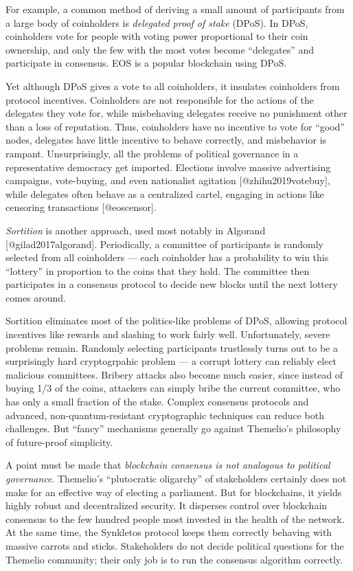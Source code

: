 \documentclass[]{article}
\begin{document}
For example, a common method of deriving a small amount of participants
from a large body of coinholders is \emph{delegated proof of stake}
(DPoS). In DPoS, coinholders vote for people with voting power
proportional to their coin ownership, and only the few with the most
votes become ``delegates'' and participate in consensus. EOS is a
popular blockchain using DPoS.

Yet although DPoS gives a vote to all coinholders, it insulates
coinholders from protocol incentives. Coinholders are not responsible
for the actions of the delegates they vote for, while misbehaving
delegates receive no punishment other than a loss of reputation. Thus,
coinholders have no incentive to vote for ``good'' nodes, delegates have
little incentive to behave correctly, and misbehavior is rampant.
Unsurprisingly, all the problems of political governance in a
representative democracy get imported. Elections involve massive
advertising campaigns, vote-buying, and even nationalist agitation
{[}@zhihu2019votebuy{]}, while delegates often behave as a centralized
cartel, engaging in actions like censoring transactions
{[}@eoscensor{]}.

\emph{Sortition} is another approach, used most notably in Algorand
{[}@gilad2017algorand{]}. Periodically, a committee of participants is
randomly selected from all coinholders --- each coinholder has a
probability to win this ``lottery'' in proportion to the coins that they
hold. The committee then participates in a consensus protocol to decide
new blocks until the next lottery comes around.

Sortition eliminates most of the politics-like problems of DPoS,
allowing protocol incentives like rewards and slashing to work fairly
well. Unfortunately, severe problems remain. Randomly selecting
participants trustlessly turns out to be a surprisingly hard
cryptogrpahic problem --- a corrupt lottery can reliably elect malicious
committees. Bribery attacks also become much easier, since instead of
buying 1/3 of the coins, attackers can simply bribe the current
committee, who has only a small fraction of the stake. Complex consensus
protocols and advanced, non-quantum-resistant cryptographic techniques
can reduce both challenges. But ``fancy'' mechanisms generally go
against Themelio's philosophy of future-proof simplicity.

A point must be made that \emph{blockchain consensus is not analogous to
political governance}. Themelio's ``plutocratic oligarchy'' of
stakeholders certainly does not make for an effective way of electing a
parliament. But for blockchains, it yields highly robust and
decentralized security. It disperses control over blockchain consensus
to the few hundred people most invested in the health of the network. At
the same time, the Synkletos protocol keeps them correctly behaving with
massive carrots and sticks. Stakeholders do not decide political
questions for the Themelio community; their only job is to run the
consensus algorithm correctly.
\end{document}
